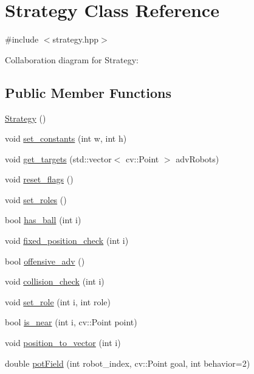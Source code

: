 \hypertarget{class_strategy}{}\section{Strategy Class Reference}
\label{class_strategy}


{\ttfamily \#include $<$strategy.\+hpp$>$}



Collaboration diagram for Strategy\+:
\subsection*{Public Member Functions}
\begin{DoxyCompactItemize}
\item 
\hyperlink{class_strategy_a2021a15bbc4f0d13f7b92f8933db2235}{Strategy} ()
\item 
void \hyperlink{class_strategy_a00120223877a8f4a97ef2ef4f8cecb1b}{set\+\_\+constants} (int w, int h)
\item 
void \hyperlink{class_strategy_ab1c455b23e8b7f3377132a3e243f8f76}{get\+\_\+targets} (std\+::vector$<$ cv\+::\+Point $>$ adv\+Robots)
\item 
void \hyperlink{class_strategy_a44da3c45d60d32f6ef2d81859d47b2b4}{reset\+\_\+flags} ()
\item 
void \hyperlink{class_strategy_a35458436b6f9d4f080ce8415af3dc599}{set\+\_\+roles} ()
\item 
bool \hyperlink{class_strategy_af607e7b52f48a6c490549898e752fda2}{has\+\_\+ball} (int i)
\item 
void \hyperlink{class_strategy_aabfdf0c3cd206c94e8b37f86bb387a61}{fixed\+\_\+position\+\_\+check} (int i)
\item 
bool \hyperlink{class_strategy_abb6bf2cb095ffd73ec9501f2abcd27c0}{offensive\+\_\+adv} ()
\item 
void \hyperlink{class_strategy_a8d1fa6e7cb13f7eb135bc853beef462d}{collision\+\_\+check} (int i)
\item 
void \hyperlink{class_strategy_ad2a232eda7c95636be17a3d528547b5f}{set\+\_\+role} (int i, int role)
\item 
bool \hyperlink{class_strategy_a39e538cde3f236f918ad8b7501c92987}{is\+\_\+near} (int i, cv\+::\+Point point)
\item 
void \hyperlink{class_strategy_afa755796f0301750d616afac02ac935a}{position\+\_\+to\+\_\+vector} (int i)
\item 
double \hyperlink{class_strategy_ac26f11116f795185176383122f9f088c}{pot\+Field} (int robot\+\_\+index, cv\+::\+Point goal, int behavior=2)

\end{DoxyCompactItemize}

